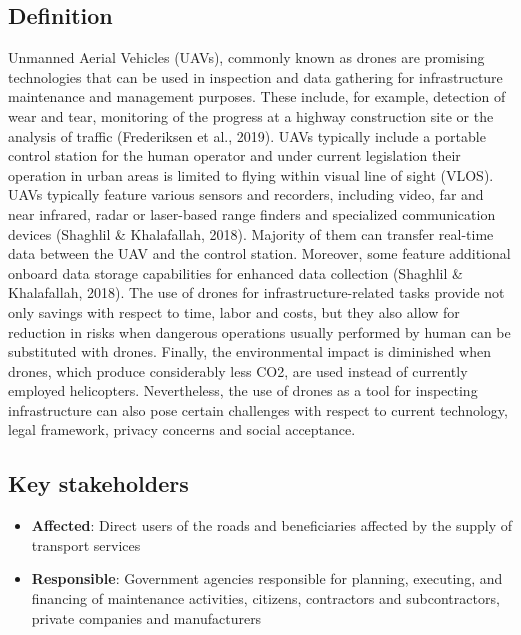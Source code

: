 \documentclass[
]{book}
\providecommand{\tightlist}{%
  \setlength{\itemsep}{0pt}\setlength{\parskip}{0pt}}
\begin{document}
\hypertarget{definition-2}{%
\subsection*{Definition}\label{definition-2}}

Unmanned Aerial Vehicles (UAVs), commonly known as drones are promising technologies that can be used in inspection and data gathering for infrastructure maintenance and management purposes. These include, for example, detection of wear and tear, monitoring of the progress at a highway construction site or the analysis of traffic (Frederiksen et al., 2019). UAVs typically include a portable control station for the human operator and under current legislation their operation in urban areas is limited to flying within visual line of sight (VLOS). UAVs typically feature various sensors and recorders, including video, far and near infrared, radar or laser-based range finders and specialized communication devices (Shaghlil \& Khalafallah, 2018). Majority of them can transfer real-time data between the UAV and the control station. Moreover, some feature additional onboard data storage capabilities for enhanced data collection (Shaghlil \& Khalafallah, 2018). The use of drones for infrastructure-related tasks provide not only savings with respect to time, labor and costs, but they also allow for reduction in risks when dangerous operations usually performed by human can be substituted with drones. Finally, the environmental impact is diminished when drones, which produce considerably less CO2, are used instead of currently employed helicopters. Nevertheless, the use of drones as a tool for inspecting infrastructure can also pose certain challenges with respect to current technology, legal framework, privacy concerns and social acceptance.

\hypertarget{key-stakeholders-2}{%
\subsection*{Key stakeholders}\label{key-stakeholders-2}}

\begin{itemize}
\tightlist
\item
  \textbf{Affected}: Direct users of the roads and beneficiaries affected by the supply of transport services
\item
  \textbf{Responsible}: Government agencies responsible for planning, executing, and financing of maintenance activities, citizens, contractors and subcontractors, private companies and manufacturers
\end{itemize}
\end{document}

